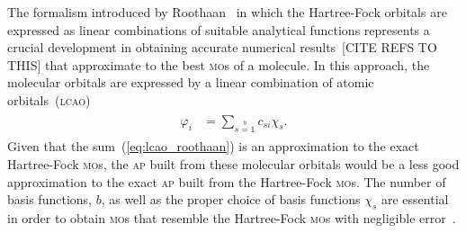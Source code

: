 The formalism introduced by Roothaan~\cite{Roothaan_HF} in which the
Hartree-Fock orbitals are expressed as linear combinations of suitable
analytical functions represents a crucial development in obtaining
accurate numerical results~[CITE REFS TO THIS] that approximate to the
best \textsc{mo}s of a molecule. In this approach, the molecular
orbitals are expressed by a linear combination of atomic
orbitals~(\textsc{lcao})~\cite{Roothaan_HF}
%
\begin{eqnarray}
  \begin{split}
    \varphi_{i} & = \sum\limits_{s=1}\limits^{b} c_{si} \chi_{s}.
  \end{split}
  \label{eq:lcao_roothaan}
\end{eqnarray}
%
Given that the sum~(\ref{eq:lcao_roothaan}) is an approximation to the
exact Hartree-Fock \textsc{mo}s, the \textsc{ap} built from these
molecular orbitals would be a less good approximation to the exact
\textsc{ap} built from the Hartree-Fock \textsc{mo}s. The number of
basis functions, $b$, as well as the proper choice of basis functions
$\chi_{s}$ are essential in order to obtain \textsc{mo}s that resemble
the Hartree-Fock \textsc{mo}s with negligible
error~\cite{Moccia_JCP_2164,Moccia_JCP_2176,Moccia_1964}.

